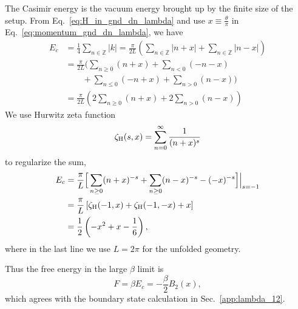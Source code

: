 The Casimir energy is the vacuum energy brought up by the finite size of the setup. From Eq.~\eqref{eq:H_in_gnd_dn_lambda} and use $x\equiv \frac{\theta}{\pi}$ in Eq.~\eqref{eq:momentum_gnd_dn_lambda}, we have
\begin{equation}
\begin{aligned}
E_c &= \frac{1}{4} \sum_{n \in \mathbb{Z}} | k| = \frac{\pi}{2L} \left( \sum_{n \in \mathbb{Z}}  | n + x | + \sum_{n \in \mathbb{Z}}  | n - x |  \right) \\
&= \frac{\pi}{2L} \Bigg( \sum_{n\ge 0 }  ( n + x ) + \sum_{n< 0 }  ( -n - x )  \\
&\quad \quad + \sum_{n \le 0}  (- n + x ) + \sum_{n > 0} ( n- x )  \Bigg) \\
&= \frac{\pi}{2L} \left( 2\sum_{n\ge 0 }  ( n + x ) + 2\sum_{n > 0} ( n- x )  \right)
\end{aligned}
\end{equation}
We use Hurwitz zeta function
\begin{equation}
\zeta_{\rm H}(s,x) = \sum_{n=0}^\infty\frac{1}{(n+x)^s}
\end{equation}
to regularize the sum, 
\begin{equation}
\begin{aligned}
E_c &= \frac{\pi}{L} \Big[\sum_{n \ge 0 } ( n + x )^{-s} + \sum_{n \ge 0 }  ( n - x)^{-s}  -  (-x)^{-s} \Big]\Big|_{s = -1} \\
&= \frac{\pi}{L} \left[ \zeta_{\rm H}( -1, x ) + \zeta_{\rm H}( -1, -x ) +  x \right] \\
&= \frac{1}{2} \left( - x^2 + x - \frac{1}{6}\right),
\end{aligned}
\end{equation}
where in the last line we use $L = 2\pi$ for the unfolded geometry. 

Thus the free energy in the large $\beta$ limit is
\begin{equation}
F = \beta E_c = - \frac{\beta}{2} B_2( x) ,
\end{equation}
which agrees with the boundary state calculation in Sec.~\ref{app:lambda_12}. 

